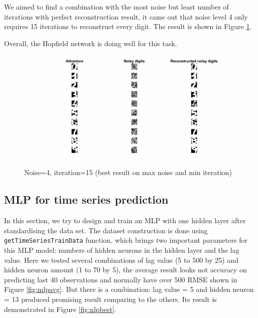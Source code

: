 \documentclass{article}
\begin{document}
We aimed to find a combination with the most noise but least number of iterations with perfect reconstruction result, it came out that noise level 4 only requires 15 iterations to reconstruct every digit. The result is shown in Figure \ref{fig:finalnoise}.

Overall, the Hopfield network is doing well for this task.

\begin{figure}[h!]
  \centering
  \includegraphics[width=.85\textwidth]{lab2/noise4ite15.pdf}
  \caption{Noise=4, iteration=15 (best result on max noise and min iteration)}
  \label{fig:finalnoise}
\end{figure}


\subsection{MLP for time series prediction}
In this section, we try to design and train an MLP with one hidden layer after standardising the data set. The dataset construction is done using \verb|getTimeSeriesTrainData| function, which brings two important parameters for this MLP model: numbers of hidden neurons in the hidden layer and the lag value. Here we tested several combinations of lag value (5 to 500 by 25) and hidden neuron amount (1 to 70 by 5), the average result looks not accuracy on predicting last 40 observations and normally have over 500 RMSE shown in Figure \ref{fig:mlpavg}. But there is a combination: lag value = 5 and hidden neuron = 13 produced promising result comparing to the others. Its result is demonstrated in Figure \ref{fig:nlpbest}.
\end{document}
